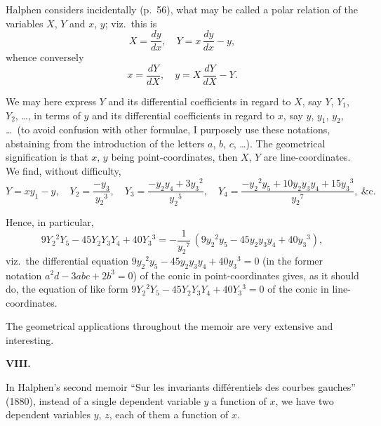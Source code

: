 \documentclass[11pt]{article}
\begin{document}
Halphen considers incidentally (p.\ 56), what may be called a polar relation of the variables $X$, $Y$ and $x$, $y$; viz.\ this is
\[
X = \frac{dy}{dx},\quad Y = x\,\frac{dy}{dx} - y,
\]
whence conversely
\[
x = \frac{dY}{dX},\quad y = X\,\frac{dY}{dX} - Y.
\]

We may here express $Y$ and its differential coefficients in regard to $X$, say $Y$, $Y_1$, $Y_2$, \ldots, in terms of $y$ and its differential coefficients in regard to $x$, say $y$, $y_1$, $y_2$, \ldots\ (to avoid confusion with other formulae, I purposely use these notations, abstaining from the introduction of the letters $a$, $b$, $c$, \ldots). The geometrical signification is that $x$, $y$ being point-coordinates, then $X$, $Y$ are line-coordinates. We find, without difficulty,
\[
Y = x y_1 - y,\quad Y_2 = \frac{-y_3}{y_2{}^3},\quad Y_3 = \frac{-y_2 y_4 + 3 y_3{}^2}{y_2{}^5},\quad Y_4 = \frac{-y_2{}^2 y_5 + 10 y_2 y_3 y_4 + 15 y_3{}^3}{y_2{}^7},\ \&\mathrm{c}.
\]

Hence, in particular,
\[
9 Y_2{}^2 Y_5 - 45 Y_2 Y_3 Y_4 + 40 Y_3{}^3 = -\frac{1}{y_2{}^7}\,(9 y_2{}^2 y_5 - 45 y_2 y_3 y_4 + 40 y_3{}^3),
\]
viz.\ the differential equation $9 y_2{}^2 y_5 - 45 y_2 y_3 y_4 + 40 y_3{}^3 = 0$ (in the former notation $a^2 d - 3 a b c + 2 b^3 = 0$) of the conic in point-coordinates gives, as it should do, the equation of like form $9 Y_2{}^2 Y_5 - 45 Y_2 Y_3 Y_4 + 40 Y_3{}^3 = 0$ of the conic in line-coordinates.

The geometrical applications throughout the memoir are very extensive and interesting.

\medskip
\begin{center}\textbf{VIII.}\end{center}

In Halphen's second memoir ``Sur les invariants diff\'erentiels des courbes gauches'' (1880), instead of a single dependent variable $y$ a function of $x$, we have two dependent variables $y$, $z$, each of them a function of $x$.
\end{document}
